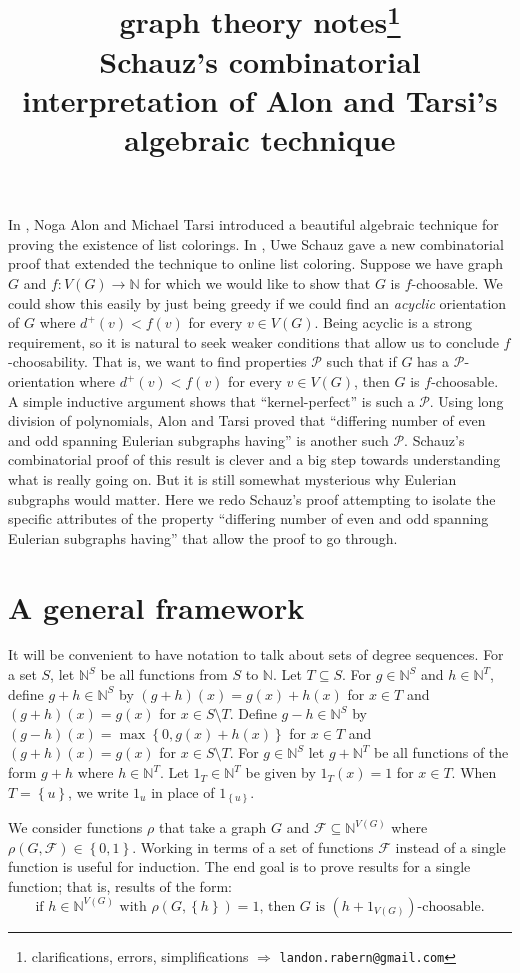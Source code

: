 \documentclass[12pt]{article}
\title{graph theory notes\thanks{clarifications, errors, simplifications $\Rightarrow$ \texttt{landon.rabern@gmail.com}}\\ \bigskip
Schauz's combinatorial interpretation of Alon and Tarsi's algebraic technique}
\date{}
\theoremstyle{plain}
\theoremstyle{definition}
\theoremstyle{remark}
\newcommand{\fancy}[1]{\mathcal{#1}}
\newcommand{\IN}{\mathbb{N}}
\newcommand{\set}[1]{\left\{ #1 \right\}}
\newcommand{\func}[3]{#1\colon #2 \rightarrow #3}
\def\P{\fancy{P}}
\def\F{\fancy{F}}
\begin{document}
\maketitle

In \cite{Alon1992125}, Noga Alon and Michael Tarsi introduced a beautiful algebraic technique for proving the existence of list colorings.  In \cite{schauz2010flexible}, Uwe Schauz gave a new combinatorial proof that extended the technique to online list coloring.  Suppose we have graph $G$ and $\func{f}{V(G)}{\IN}$ for which we would like to show that $G$ is $f$-choosable.  We could show this easily by just being greedy if we could find an \emph{acyclic} orientation of $G$ where $d^+(v) < f(v)$ for every $v \in V(G)$.  Being acyclic is a strong requirement, so it is natural to seek weaker conditions that allow us to conclude $f$-choosability.  That is, we want to find properties $\P$ such that if $G$ has a $\P$-orientation where $d^+(v) < f(v)$ for every $v \in V(G)$, then $G$ is $f$-choosable.  A simple inductive argument shows that ``kernel-perfect'' is such a $\P$.  Using long division of polynomials, Alon and Tarsi proved that ``differing number of even and odd spanning Eulerian subgraphs having'' is another such $\P$.  Schauz's combinatorial proof of this result is clever and a big step towards understanding what is really going on. But it is still somewhat mysterious why Eulerian subgraphs would matter.  Here we redo Schauz's proof attempting to isolate the specific attributes of the property ``differing number of even and odd spanning Eulerian subgraphs having'' that allow the proof to go through.

\section{A general framework}
It will be convenient to have notation to talk about sets of degree sequences. For a set $S$, let $\IN^S$ be all functions from $S$ to $\IN$.  Let $T \subseteq S$. For $g\in \IN^S$ and $h \in \IN^T$, define $g+h \in \IN^S$ by $(g+h)(x) = g(x) + h(x)$ for $x \in T$ and $(g+h)(x) = g(x)$ for $x \in S\setminus T$. Define $g-h \in \IN^S$ by $(g-h)(x) = \max\set{0, g(x) + h(x)}$ for $x \in T$ and $(g+h)(x) = g(x)$ for $x \in S\setminus T$.  For $g \in \IN^S$ let $g + \IN^T$ be all functions of the form $g + h$ where $h \in \IN^T$.  Let $1_T \in \IN^T$ be given by $1_T(x) = 1$ for $x \in T$.  When $T = \set{u}$, we write $1_u$ in place of $1_{\set{u}}$.

We consider functions $\rho$ that take a graph $G$ and $\F \subseteq \IN^{V(G)}$ where $\rho(G,\F) \in \set{0,1}$.  Working in terms of a set of functions $\F$ instead of a single function is useful for induction. The end goal is to prove results for a single function; that is, results of the form:
\[\text{if } h \in \IN^{V(G)} \text{ with } \rho(G, \set{h}) = 1\text{, then } G \text{ is } (h + 1_{V(G)})\text{-choosable}.\]
\end{document}
